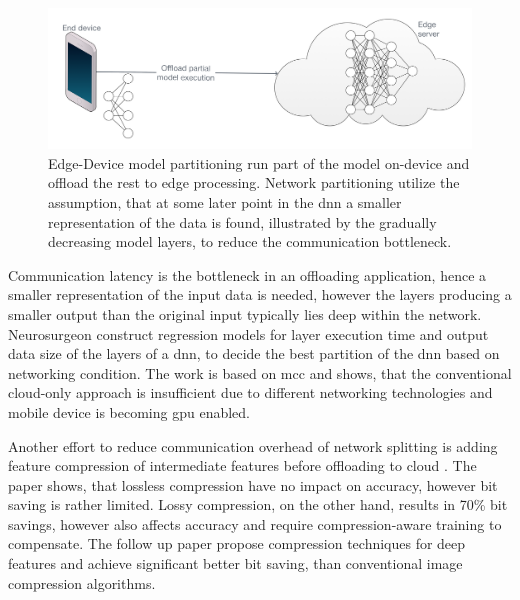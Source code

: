 \begin{figure}
	\centering
	\includegraphics[width=\linewidth]{figures/models/partitioning}
	\caption[Model partitioning]{Edge-Device model partitioning run part of the model on-device and offload the rest to edge processing. Network partitioning utilize the assumption, that at some later point in the \gls{dnn} a smaller representation of the data is found, illustrated by the gradually decreasing model layers, to reduce the communication bottleneck. }
	\label{fig:offlaoding}
\end{figure}

Communication latency is the bottleneck in an offloading application, hence a smaller representation of the input data is needed, however the layers producing a smaller output than the original input typically lies deep within the network. Neurosurgeon construct regression models for layer execution time and  output data size of the layers of a \gls{dnn}, to decide the best partition of the \gls{dnn} based on networking condition. The work is based on \gls{mcc} and shows, that the conventional cloud-only approach is insufficient due to different networking technologies and mobile device is becoming \gls{gpu} enabled. 

Another effort to reduce communication overhead of network splitting is adding feature compression of intermediate features before offloading to cloud \cite{choi_deep_2018}. The paper shows, that lossless compression have no impact on accuracy, however bit saving is rather limited. Lossy compression, on the other hand, results in 70\% bit savings, however also affects accuracy and require compression-aware training to compensate. The follow up paper \cite{choi_near-lossless_2018} propose compression techniques for deep features and achieve significant better bit saving, than conventional image compression algorithms. 

